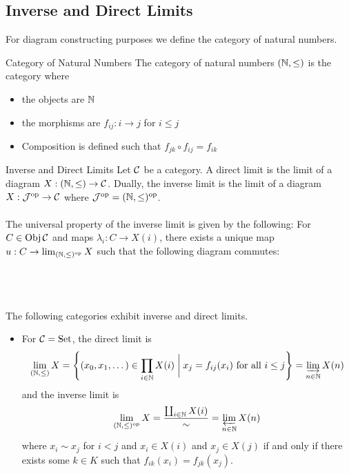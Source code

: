 \documentclass[a4paper]{article}
\begin{document}
\subsection{Inverse and Direct Limits}
For diagram constructing purposes we define the category of natural numbers. 

\begin{defn}{Category of Natural Numbers}{} The category of natural numbers $(\mathbb{N},\leq)$ is the category where 
\begin{itemize}
\item the objects are $\mathbb{N}$
\item the morphisms are $f_{ij}:i\to j$ for $i\leq j$
\item Composition is defined such that $f_{jk}\circ f_{ij}=f_{ik}$
\end{itemize}
\end{defn}

\begin{defn}{Inverse and Direct Limits}{} Let $\mathcal{C}$ be a category. A direct limit is the limit of a diagram $X:(\mathbb{N},\leq)\to\mathcal{C}$. Dually, the inverse limit is the limit of a diagram $X:\mathcal{J}^{\text{op}}\to\mathcal{C}$ where $\mathcal{J}^{\text{op}}=(\mathbb{N},\leq)^{\text{op}}$. \\~\\

The universal property of the inverse limit is given by the following: For $C\in\operatorname{Obj}\mathcal{C}$ and maps $\lambda_i:C\to X(i)$, there exists a unique map $u:C\to\lim_{(\mathbb{N},\leq)^{\text{op}}}X$ such that the following diagram commutes: \\~\\
\\~\\
\end{defn}

\begin{prp}{}{} The following categories exhibit inverse and direct limits. 
\begin{itemize}
\item For $\mathcal{C}=\text{Set}$, the direct limit is $$\lim_{(\mathbb{N},\leq)}X=\left\{(x_0,x_1,\dots)\in\prod_{i\in \mathbb{N}}X(i)\;\bigg{|}\;x_j=f_{ij}(x_i)\text{ for all }i\leq j\right\}=\varinjlim_{n\in\mathbb{N}}X(n)$$ and the inverse limit is $$\lim_{(\mathbb{N},\leq)^\text{op}}X=\frac{\coprod_{i\in\mathbb{N}}X(i)}{\sim}=\varprojlim_{n\in\mathbb{N}}X(n)$$ where $x_i\sim x_j$ for $i<j$ and $x_i\in X(i)$ and $x_j\in X(j)$ if and only if there exists some $k\in K$ such that $f_{ik}(x_i)=f_{jk}(x_j)$. 
\end{itemize}
\end{prp}
\end{document}
